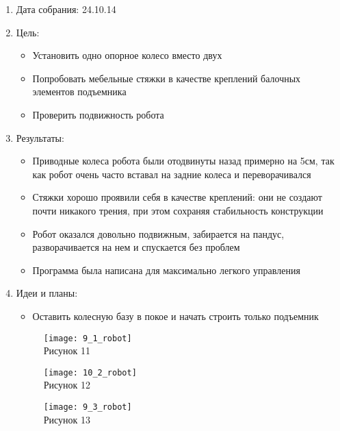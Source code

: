 
	\begin{enumerate}
		\item Дата собрания: 24.10.14
		\item Цель:
		\begin{itemize}
			\item Установить одно опорное колесо вместо двух
			\item Попробовать мебельные стяжки в качестве креплений балочных элементов подъемника
			\item Проверить подвижность робота
		\end{itemize}			
		\item Результаты:
		\begin{itemize}
			\item Приводные колеса робота были отодвинуты назад примерно на 5см, так как робот очень часто вставал на задние колеса и переворачивался
			\item Стяжки хорошо проявили себя в качестве креплений: они не создают почти никакого трения, при этом сохраняя стабильность конструкции
			\item Робот оказался довольно подвижным, забирается на пандус, разворачивается на нем и спускается без проблем
			\item Программа была написана для максимально легкого управления
		\end{itemize}
		\item Идеи и планы:
		\begin{itemize}
			\item Оставить колесную базу в покое и начать строить только подъемник
		\end{itemize}
		\begin{figure} [h]
			\centering
			\begin{minipage}{0.3\linewidth}
				\texttt{[image: 9\_1\_robot]}\\ Рисунок 11
			\end{minipage}
			\begin{minipage}{0.3\linewidth}
				\texttt{[image: 10\_2\_robot]}\\ Рисунок 12
			\end{minipage}
			\begin{minipage}{0.3\linewidth}
				\texttt{[image: 9\_3\_robot]}\\ Рисунок 13
			\end{minipage}
		\end{figure}
	\end{enumerate}
\newpage